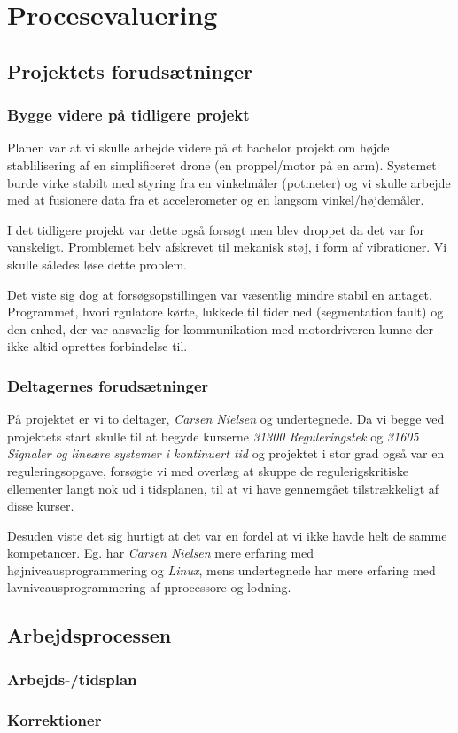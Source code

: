 


\section{Procesevaluering}
\subsection{Projektets forudsætninger}
\subsubsection{Bygge videre på tidligere projekt}
Planen var at vi skulle arbejde videre på et bachelor projekt om højde
stablilisering af en simplificeret drone (en proppel/motor på en arm).
Systemet burde virke stabilt med styring fra en vinkelmåler
(potmeter) og vi skulle arbejde med at fusionere data fra et accelerometer og en
langsom vinkel/højdemåler.

I det tidligere projekt var dette også forsøgt men blev droppet da det var for
vanskeligt. Promblemet belv afskrevet til mekanisk støj, i form af vibrationer.
Vi skulle således løse dette problem.

Det viste sig dog at forsøgsopstillingen var væsentlig mindre stabil en antaget.
Programmet, hvori rgulatore kørte, lukkede til tider ned (segmentation fault) og
den enhed, der var ansvarlig for kommunikation med motordriveren kunne der ikke
altid oprettes forbindelse til.

\subsubsection{Deltagernes forudsætninger}
På projektet er vi to deltager, \emph{Carsen Nielsen} og undertegnede.
Da vi begge ved projektets start skulle til at begyde kurserne \emph{31300
Reguleringstek} og \emph{31605 Signaler og lineære systemer i kontinuert tid}
og projektet i stor grad også var en reguleringsopgave, forsøgte vi med overlæg at
skuppe de regulerigskritiske ellementer langt nok ud i tidsplanen, til at vi
have gennemgået tilstrækkeligt af disse kurser.

Desuden viste det sig hurtigt at det var en fordel at vi ikke havde helt de
samme kompetancer. Eg. har \emph{Carsen Nielsen} mere erfaring med
højniveausprogrammering og \emph{Linux}, mens undertegnede har mere erfaring med
lavniveausprogrammering af µprocessore og lodning.

\subsection{Arbejdsprocessen}
\subsubsection{Arbejds-/tidsplan}
\subsubsection{Korrektioner}



